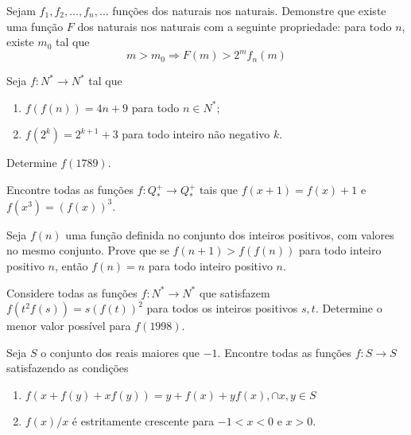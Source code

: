 \begin{questao}
  Sejam $f_1,f_2,\ldots,f_n,\ldots$ funções dos naturais nos naturais. Demonstre
  que existe uma função $F$ dos naturais nos naturais com a seguinte
  propriedade: para todo $n$, existe $m_0$ tal que $$m > m_0 \Rightarrow F(m) >
  2^mf_n(m)$$
\end{questao}

\begin{questao}
  Seja $f:N^{*} \rightarrow N^{*}$ tal que

  \begin{enumerate}

  \item $f(f(n)) = 4n+9$ para todo $n \in N^{*}$;

  \item $f(2^k) = 2^{k+1}+3$ para todo inteiro não negativo $k$.
  \end{enumerate}

  Determine $f(1789)$.
\end{questao}

\begin{questao}
  Encontre todas as funções $f: {Q^+_*} \rightarrow {Q^+_*}$ tais que
  $f(x+1)=f(x)+1$ e $f(x^3)=(f(x))^3$.
\end{questao}

\begin{questao}
  Seja $f(n)$ uma função definida no conjunto dos inteiros positivos, com
  valores no mesmo conjunto. Prove que se $f(n+1) > f(f(n))$ para todo inteiro
  positivo $n$, então $f(n)=n$ para todo inteiro positivo $n$.
\end{questao}

\begin{questao}
  Considere todas as funções $f:N^{*} \rightarrow N^{*}$ que satisfazem
  $f(t^2f(s)) = s(f(t))^2$ para todos os inteiros positivos $s,t$. Determine o
  menor valor possível para $f(1998)$.
\end{questao}

\begin{questao}
  Seja $S$ o conjunto dos reais maiores que $-1$. Encontre todas as funções $f:
  S \rightarrow S$ satisfazendo as condições


  \begin{enumerate}

  \item $f(x+f(y)+xf(y)) = y+f(x)+yf(x), \cap x,y \in S$

  \item $f(x)/x$ é estritamente crescente para $-1<x<0$ e $x>0$.
  \end{enumerate}
\end{questao}

